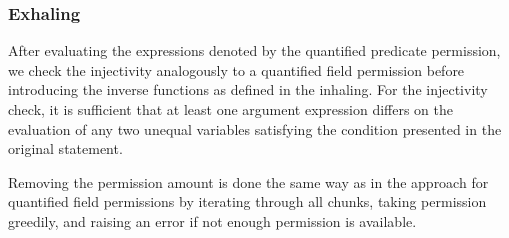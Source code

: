 \documentclass[12pt]{article}
\begin{document}

\subsubsection{Exhaling}
After evaluating the expressions denoted by the quantified predicate permission, we check the injectivity analogously to a quantified field permission before introducing the inverse functions as defined in the inhaling. For the injectivity check, it is sufficient that at least one argument expression differs on the evaluation of any two unequal variables satisfying the condition presented in the original statement. %

Removing the permission amount is done the same way as in the approach for quantified field permissions by iterating through all chunks, taking permission greedily, and raising an error if not enough permission is available.
\end{document}
